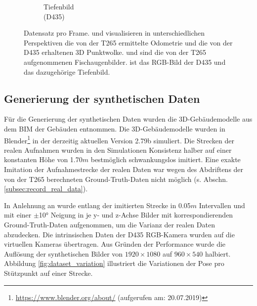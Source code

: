 \begin{figure}
\begin{subfigure}[t]{0.3\linewidth}
		\caption{Tiefenbild \\ (D435) \hspace*{2cm}}
		\label{subfig:depth-image}
	\end{subfigure}
	\caption{Datensatz pro Frame.  und  visualisieren in unterschiedlichen Perspektiven die von der T265 ermittelte Odometrie und die von der D435 erhaltenen 3D Punktwolke.  und  sind die von der T265 aufgenommenen Fischaugenbilder.  ist das RGB-Bild der D435 und  das dazugehörige Tiefenbild. }
	\label{fig:dataset}
\end{figure}

\subsection{Generierung der synthetischen Daten}
\label{subsec:generate_synth_images}
Für die Generierung der synthetischen Daten wurden die 3D-Gebäudemodelle aus dem BIM der Gebäuden entnommen. Die 3D-Gebäudemodelle wurden in Blender\footnote{\url{https://www.blender.org/about/} (aufgerufen am: 20.07.2019)} in der derzeitig aktuellen Version 2.79b simuliert. Die Strecken der realen Aufnahmen wurden in den Simulationen Konsistenz halber auf einer konstanten Höhe von 1.70$m$ bestmöglich schwankungslos imitiert. Eine exakte Imitation der Aufnahmestrecke der realen Daten war wegen des Abdriftens der von der T265 berechneten Ground-Truth-Daten nicht möglich (s. Abschn. \ref{subsec:record_real_data}).

In Anlehnung an \citet{acharyaBIMPoseNetIndoorCamera2019} wurde entlang der imitierten Strecke in 0.05$m$ Intervallen und mit einer $\pm$10° Neigung in je y- und z-Achse Bilder mit korrespondierenden Ground-Truth-Daten aufgenommen, um die Varianz der realen Daten abzudecken. Die intrinsischen Daten der D435 RGB-Kamera wurden auf die virtuellen Kameras übertragen. Aus Gründen der Performance wurde die Auflösung der synthetischen Bilder von $1920\times1080$ auf $960\times540$ halbiert. Abbildung \ref{fig:dataset_variation} illustriert die Variationen der Pose pro Stützpunkt auf einer Strecke.


